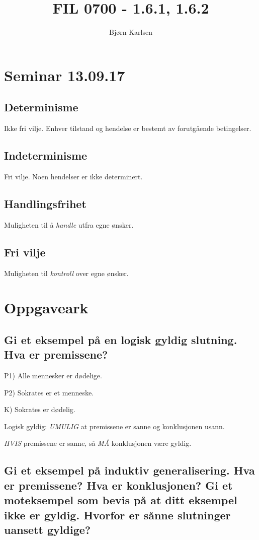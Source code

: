 \documentclass[11pt]{article}
\title{\textbf{FIL 0700 - 1.6.1, 1.6.2}}
\author{Bjørn Karlsen}
\date{}
\begin{document}
\maketitle

\section{Seminar 13.09.17}

\subsection{Determinisme}
Ikke fri vilje.
Enhver tilstand og hendelse er bestemt av forutgående betingelser.

\subsection{Indeterminisme}
Fri vilje.
Noen hendelser er ikke determinert.

\subsection{Handlingsfrihet}
Muligheten til å \emph{handle} utfra egne ønsker.

\subsection{Fri vilje}
Muligheten til \emph{kontroll} over egne ønsker.

\section{Oppgaveark}

\subsection{Gi et eksempel på en logisk gyldig slutning. Hva er premissene?}

P1) Alle mennesker er dødelige.

P2) Sokrates er et menneske.

K)  Sokrates er dødelig.

Logisk gyldig: \emph{UMULIG} at premissene er sanne og konklusjonen usann.

\emph{HVIS} premissene er sanne, så \emph{MÅ} konklusjonen være gyldig.

\subsection{Gi et eksempel på induktiv generalisering. Hva er premissene? Hva er konklusjonen? Gi et moteksempel som bevis på at ditt eksempel ikke er gyldig. Hvorfor er sånne slutninger uansett gyldige?}
\end{document}

